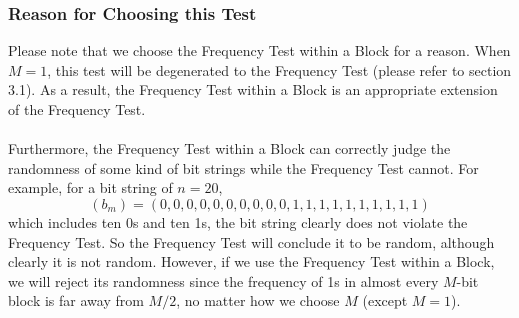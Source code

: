 \documentclass[a4paper,12pt]{article}
\begin{document}
\subsubsection{Reason for Choosing this Test}
\noindent Please note that we choose the Frequency Test within a Block for a reason. When $M=1$, this test will be degenerated to the Frequency Test (please refer to section 3.1). As a result, the Frequency Test within a Block is an appropriate extension of the Frequency Test. \\\\Furthermore, the Frequency Test within a Block can correctly judge the randomness of some kind of bit strings while the Frequency Test cannot. For example, for a bit string of $n=20$,
$$
\left(b_{m}\right)=(0,0,0,0,0,0,0,0,0,0,
1,1,1,1,1,1,1,1,1,1)
$$
which includes ten 0s and ten 1s, the bit string clearly does not violate the Frequency Test. So the Frequency Test will conclude it to be random, although clearly it is not random. However, if we use the Frequency Test within a Block, we will reject its randomness since the frequency of 1s in almost every $M$-bit block is far away from $M/2$, no matter how we choose $M$ (except $M=1$).
\end{document}
